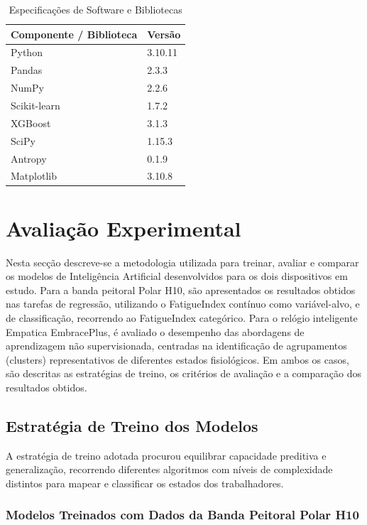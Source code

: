 \begin{table}[H]
\centering
\caption{Especificações de Software e Bibliotecas}
\label{tab:software}
\begin{tabular}{@{}ll@{}}
\toprule
Componente / Biblioteca & Versão \\
\midrule
Python & 3.10.11 \\
Pandas & 2.3.3 \\
NumPy & 2.2.6 \\
Scikit-learn & 1.7.2 \\
XGBoost & 3.1.3 \\
SciPy & 1.15.3 \\
Antropy & 0.1.9 \\
Matplotlib & 3.10.8 \\
\bottomrule
\end{tabular}
\end{table}

\section{Avaliação Experimental}

Nesta secção descreve-se a metodologia utilizada para treinar, avaliar e comparar os modelos de Inteligência Artificial desenvolvidos para os dois dispositivos em estudo. Para a banda peitoral Polar H10, são apresentados os resultados obtidos nas tarefas de regressão, utilizando o FatigueIndex contínuo como variável-alvo, e de classificação, recorrendo ao FatigueIndex categórico. Para o relógio inteligente Empatica EmbracePlus, é avaliado o desempenho das abordagens de aprendizagem não supervisionada, centradas na identificação de agrupamentos (clusters) representativos de diferentes estados fisiológicos. Em ambos os casos, são descritas as estratégias de treino, os critérios de avaliação e a comparação dos resultados obtidos.

\subsection{Estratégia de Treino dos Modelos}

A estratégia de treino adotada procurou equilibrar capacidade preditiva e generalização, recorrendo diferentes algoritmos com níveis de complexidade distintos para mapear e classificar os estados dos trabalhadores.

\subsubsection*{Modelos Treinados com Dados da Banda Peitoral Polar H10}

